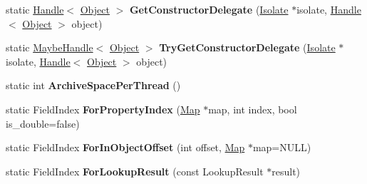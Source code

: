 \begin{DoxyCompactItemize}
\item 
\hypertarget{classv8_1_1internal_1_1_v8___f_i_n_a_l_a3bc58be565fe128f66de598673dac168}{}static \hyperlink{classv8_1_1internal_1_1_handle}{Handle}$<$ \hyperlink{classv8_1_1internal_1_1_object}{Object} $>$ {\bfseries Get\+Constructor\+Delegate} (\hyperlink{classv8_1_1internal_1_1_isolate}{Isolate} $\ast$isolate, \hyperlink{classv8_1_1internal_1_1_handle}{Handle}$<$ \hyperlink{classv8_1_1internal_1_1_object}{Object} $>$ object)\label{classv8_1_1internal_1_1_v8___f_i_n_a_l_a3bc58be565fe128f66de598673dac168}

\item 
\hypertarget{classv8_1_1internal_1_1_v8___f_i_n_a_l_ac720954e1fe33864a458800b6435a88f}{}static \hyperlink{classv8_1_1internal_1_1_maybe_handle}{Maybe\+Handle}$<$ \hyperlink{classv8_1_1internal_1_1_object}{Object} $>$ {\bfseries Try\+Get\+Constructor\+Delegate} (\hyperlink{classv8_1_1internal_1_1_isolate}{Isolate} $\ast$isolate, \hyperlink{classv8_1_1internal_1_1_handle}{Handle}$<$ \hyperlink{classv8_1_1internal_1_1_object}{Object} $>$ object)\label{classv8_1_1internal_1_1_v8___f_i_n_a_l_ac720954e1fe33864a458800b6435a88f}

\item 
\hypertarget{classv8_1_1internal_1_1_v8___f_i_n_a_l_a0cdfb4d8a020291f8d741f60932148d8}{}static int {\bfseries Archive\+Space\+Per\+Thread} ()\label{classv8_1_1internal_1_1_v8___f_i_n_a_l_a0cdfb4d8a020291f8d741f60932148d8}

\item 
\hypertarget{classv8_1_1internal_1_1_v8___f_i_n_a_l_a8ec0461e57a40f55dd09825e3baff982}{}static Field\+Index {\bfseries For\+Property\+Index} (\hyperlink{classv8_1_1internal_1_1_map}{Map} $\ast$map, int index, bool is\+\_\+double=false)\label{classv8_1_1internal_1_1_v8___f_i_n_a_l_a8ec0461e57a40f55dd09825e3baff982}

\item 
\hypertarget{classv8_1_1internal_1_1_v8___f_i_n_a_l_a01f8cc139479787040b82deaaadbdfa3}{}static Field\+Index {\bfseries For\+In\+Object\+Offset} (int offset, \hyperlink{classv8_1_1internal_1_1_map}{Map} $\ast$map=N\+U\+L\+L)\label{classv8_1_1internal_1_1_v8___f_i_n_a_l_a01f8cc139479787040b82deaaadbdfa3}

\item 
\hypertarget{classv8_1_1internal_1_1_v8___f_i_n_a_l_a3999eb59e779af29c6081fe1da9ab78c}{}static Field\+Index {\bfseries For\+Lookup\+Result} (const Lookup\+Result $\ast$result)\label{classv8_1_1internal_1_1_v8___f_i_n_a_l_a3999eb59e779af29c6081fe1da9ab78c}


\end{DoxyCompactItemize}
